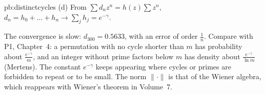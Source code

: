 \begin{solution}{pb:distinctcycles}
(d) From $\sum d_nz^n=h(z)\sum z^n$, $d_n=h_0+\dots+h_n\to\sum_jh_j=e^{-\gamma}$.

\leads The convergence is slow: $d_{300}=0.5633$, with an error of order $\frac1n$. Compare with P1, Chapter~4: a permutation with no cycle shorter than $m$ has probability
about $\frac{e^{-\gamma}}m$, and an integer without prime factors below $m$ has density about $\frac{e^{-\gamma}}{\ln m}$ (Mertens). The constant $e^{-\gamma}$ keeps appearing where
cycles or primes are forbidden to repeat or to be small. The norm $\|\cdot\|$ is that of the Wiener algebra, which reappears with Wiener's theorem in Volume~7.
\end{solution}


